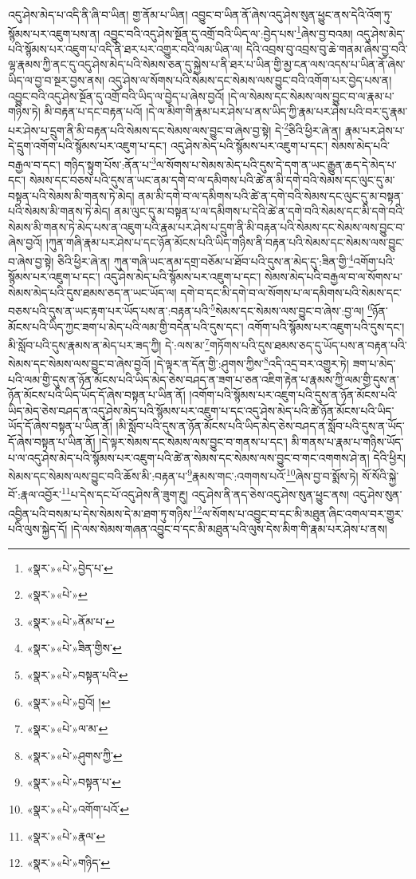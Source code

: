 འདུ་ཤེས་མེད་པ་འདི་ནི་ཞི་བ་ཡིན། གྱ་ནོམ་པ་ཡིན། འབྱུང་བ་ཡིན་ནོ་ཞེས་འདུ་ཤེས་སུན་ཕྱུང་ནས་དེའི་འོག་ཏུ་སྙོམས་པར་འཇུག་པས་ན། འབྱུང་བའི་འདུ་ཤེས་སྔོན་དུ་འགྲོ་བའི་ཡིད་ལ་:བྱེད་པས་\footnote{«སྣར་»«པེ་»བྱེད་པ་}ཞེས་བྱ་བའམ། འདུ་ཤེས་མེད་པའི་སྙོམས་པར་འཇུག་པ་འདི་ནི་ཐར་པར་འགྱུར་བའི་ལམ་ཡིན་ལ། དེའི་འབྲས་བུ་འབྲས་བུ་ཆེ་གནམ་ཞེས་བྱ་བའི་ལྷ་རྣམས་ཀྱི་ནང་དུ་འདུ་ཤེས་མེད་པའི་སེམས་ཅན་དུ་སྐྱེས་པ་ནི་ཐར་པ་ཡིན་གྱི་མྱ་ངན་ལས་འདས་པ་ཡིན་ནོ་ཞེས་ཡིད་ལ་བྱ་བ་སྔར་བྱས་ནས། འདུ་ཤེས་ལ་སོགས་པའི་སེམས་དང་སེམས་ལས་བྱུང་བའི་འགོག་པར་བྱེད་པས་ན། འབྱུང་བའི་འདུ་ཤེས་སྔོན་དུ་འགྲོ་བའི་ཡིད་ལ་བྱེད་པ་ཞེས་བྱའོ། །དེ་ལ་སེམས་དང་སེམས་ལས་བྱུང་བ་ལ་རྣམ་པ་གཉིས་ཏེ། མི་བརྟན་པ་དང་བརྟན་པའོ། །དེ་ལ་མིག་གི་རྣམ་པར་ཤེས་པ་ནས་ཡིད་ཀྱི་རྣམ་པར་ཤེས་པའི་བར་དུ་རྣམ་པར་ཤེས་པ་དྲུག་ནི་མི་བརྟན་པའི་སེམས་དང་སེམས་ལས་བྱུང་བ་ཞེས་བྱ་སྟེ། དེ་\footnote{«སྣར་»«པེ་»}ཅིའི་ཕྱིར་ཞེ་ན། རྣམ་པར་ཤེས་པ་དེ་དྲུག་འགོག་པའི་སྙོམས་པར་འཇུག་པ་དང་། འདུ་ཤེས་མེད་པའི་སྙོམས་པར་འཇུག་པ་དང་། སེམས་མེད་པའི་བརྒྱལ་བ་དང་། གཉིད་སྟུག་པོས་:ནོན་པ་\footnote{«སྣར་»«པེ་»ནོམ་པ་}ལ་སོགས་པ་སེམས་མེད་པའི་དུས་དེ་དག་ན་ཡང་རྒྱུན་ཆད་དེ་མེད་པ་དང་། སེམས་དང་བཅས་པའི་དུས་ན་ཡང་ནམ་དགེ་བ་ལ་དམིགས་པའི་ཚེ་ན་མི་དགེ་བའི་སེམས་དང་ལུང་དུ་མ་བསྟན་པའི་སེམས་མི་གནས་ཏེ་མེད། ནམ་མི་དགེ་བ་ལ་དམིགས་པའི་ཚེ་ན་དགེ་བའི་སེམས་དང་ལུང་དུ་མ་བསྟན་པའི་སེམས་མི་གནས་ཏེ་མེད། ནམ་ལུང་དུ་མ་བསྟན་པ་ལ་དམིགས་པ་དེའི་ཚེ་ན་དགེ་བའི་སེམས་དང་མི་དགེ་བའི་སེམས་མི་གནས་ཏེ་མེད་པས་ན་འཇུག་པའི་རྣམ་པར་ཤེས་པ་དྲུག་ནི་མི་བརྟན་པའི་སེམས་དང་སེམས་ལས་བྱུང་བ་ཞེས་བྱའོ། །ཀུན་གཞི་རྣམ་པར་ཤེས་པ་དང་ཉོན་མོངས་པའི་ཡིད་གཉིས་ནི་བརྟན་པའི་སེམས་དང་སེམས་ལས་བྱུང་བ་ཞེས་བྱ་སྟེ། ཅིའི་ཕྱིར་ཞེ་ན། ཀུན་གཞི་ཡང་ནམ་དགྲ་བཅོམ་པ་ཐོབ་པའི་དུས་ན་མེད་དུ་:ཟིན་གྱི་\footnote{«སྣར་»«པེ་»ཟིན་གྱིས་}འགོག་པའི་སྙོམས་པར་འཇུག་པ་དང་། འདུ་ཤེས་མེད་པའི་སྙོམས་པར་འཇུག་པ་དང་། སེམས་མེད་པའི་བརྒྱལ་བ་ལ་སོགས་པ་སེམས་མེད་པའི་དུས་ཐམས་ཅད་ན་ཡང་ཡོད་ལ། དགེ་བ་དང་མི་དགེ་བ་ལ་སོགས་པ་ལ་དམིགས་པའི་སེམས་དང་བཅས་པའི་དུས་ན་ཡང་རྟག་པར་ཡོད་པས་ན་:བརྟན་པའི་\footnote{«སྣར་»«པེ་»བསྟན་པའི་}སེམས་དང་སེམས་ལས་བྱུང་བ་ཞེས་:བྱ་ལ། \footnote{«སྣར་»«པེ་»བྱའོ། ། }ཉོན་མོངས་པའི་ཡིད་ཀྱང་ཟག་པ་མེད་པའི་ལམ་གྱི་བདེན་པའི་དུས་དང་། འགོག་པའི་སྙོམས་པར་འཇུག་པའི་དུས་དང་། མི་སློབ་པའི་དུས་རྣམས་ན་མེད་པར་ཟད་ཀྱི། དེ་:ལས་མ་\footnote{«སྣར་»«པེ་»ལ་མ་}གཏོགས་པའི་དུས་ཐམས་ཅད་དུ་ཡོད་པས་ན་བརྟན་པའི་སེམས་དང་སེམས་ལས་བྱུང་བ་ཞེས་བྱའོ། །དེ་ལྟར་ན་དོན་གྱི་:ཤུགས་ཀྱིས་\footnote{«སྣར་»«པེ་»ཤུགས་ཀྱི་}འདི་འདྲ་བར་འགྱུར་ཏེ། ཟག་པ་མེད་པའི་ལམ་གྱི་དུས་ན་ཉོན་མོངས་པའི་ཡིད་མེད་ཅེས་བཤད་ན་ཟག་པ་ཅན་འཇིག་རྟེན་པ་རྣམས་ཀྱི་ལམ་གྱི་དུས་ན་ཉོན་མོངས་པའི་ཡིད་ཡོད་དོ་ཞེས་བསྟན་པ་ཡིན་ནོ། །འགོག་པའི་སྙོམས་པར་འཇུག་པའི་དུས་ན་ཉོན་མོངས་པའི་ཡིད་མེད་ཅེས་བཤད་ན་འདུ་ཤེས་མེད་པའི་སྙོམས་པར་འཇུག་པ་དང་འདུ་ཤེས་མེད་པའི་ཚེ་ཉོན་མོངས་པའི་ཡིད་ཡོད་དོ་ཞེས་བསྟན་པ་ཡིན་ནོ། །མི་སློབ་པའི་དུས་ན་ཉོན་མོངས་པའི་ཡིད་མེད་ཅེས་བཤད་ན་སློབ་པའི་དུས་ན་ཡོད་དོ་ཞེས་བསྟན་པ་ཡིན་ནོ། །དེ་ལྟར་སེམས་དང་སེམས་ལས་བྱུང་བ་གནས་པ་དང་། མི་གནས་པ་རྣམ་པ་གཉིས་ཡོད་པ་ལ་འདུ་ཤེས་མེད་པའི་སྙོམས་པར་འཇུག་པའི་ཚེ་ན་སེམས་དང་སེམས་ལས་བྱུང་བ་གང་འགགས་ཤེ་ན། དེའི་ཕྱིར། སེམས་དང་སེམས་ལས་བྱུང་བའི་ཆོས་མི་:བརྟན་པ་\footnote{«སྣར་»«པེ་»བསྟན་པ་}རྣམས་གང་:འགགས་པའོ་\footnote{«སྣར་»«པེ་»འགོག་པའོ་}ཞེས་བྱ་བ་སྨོས་ཏེ། སོ་སོའི་སྐྱེ་བོ་:རྣལ་འབྱོར་\footnote{«སྣར་»«པེ་»རྣལ་}པ་དེས་དང་པོ་འདུ་ཤེས་ནི་ཟུག་རྔུ། འདུ་ཤེས་ནི་ནད་ཅེས་འདུ་ཤེས་སུན་ཕྱུང་ནས། འདུ་ཤེས་སུན་འབྱིན་པའི་བསམ་པ་དེས་སེམས་དེ་མ་ཐག་ཏུ་གཉིས་\footnote{«སྣར་»«པེ་»གཉིད་}ལ་སོགས་པ་འབྱུང་བ་དང་མི་མཐུན་ཞིང་འགལ་བར་གྱུར་པའི་ལུས་སྐྱེད་དོ། །དེ་ལས་སེམས་གཞན་འབྱུང་བ་དང་མི་མཐུན་པའི་ལུས་དེས་མིག་གི་རྣམ་པར་ཤེས་པ་ནས། 